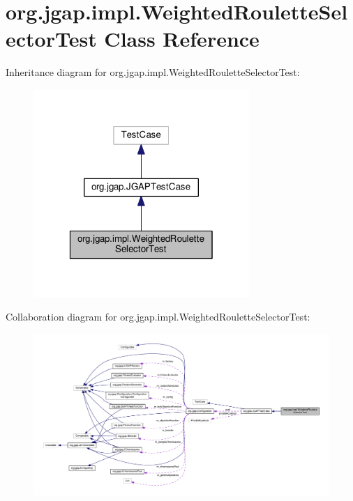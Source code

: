 \hypertarget{classorg_1_1jgap_1_1impl_1_1_weighted_roulette_selector_test}{\section{org.\-jgap.\-impl.\-Weighted\-Roulette\-Selector\-Test Class Reference}
\label{classorg_1_1jgap_1_1impl_1_1_weighted_roulette_selector_test}
}


Inheritance diagram for org.\-jgap.\-impl.\-Weighted\-Roulette\-Selector\-Test\-:
\nopagebreak
\begin{figure}[H]
\begin{center}
\leavevmode
\includegraphics[width=232pt]{classorg_1_1jgap_1_1impl_1_1_weighted_roulette_selector_test__inherit__graph}
\end{center}
\end{figure}


Collaboration diagram for org.\-jgap.\-impl.\-Weighted\-Roulette\-Selector\-Test\-:
\nopagebreak
\begin{figure}[H]
\begin{center}
\leavevmode
\includegraphics[width=350pt]{classorg_1_1jgap_1_1impl_1_1_weighted_roulette_selector_test__coll__graph}
\end{center}
\end{figure}
